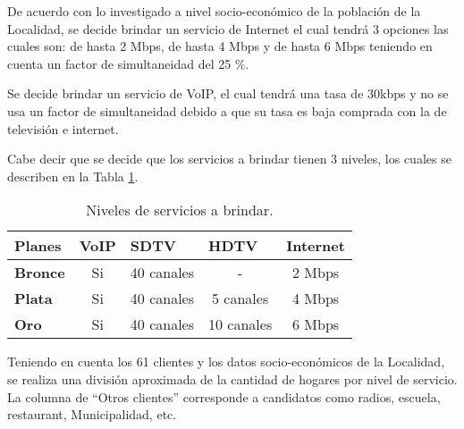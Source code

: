 De acuerdo con lo investigado a nivel socio-económico de la población de la Localidad, se decide brindar un servicio de Internet el cual tendrá 3 opciones las cuales son: de hasta 2 Mbps, de hasta 4 Mbps y de hasta 6 Mbps teniendo en cuenta un factor de simultaneidad del 25 \%.  

Se decide brindar un servicio de VoIP, el cual tendrá una tasa de 30kbps y no se usa un factor de simultaneidad  debido a que su tasa es baja comprada con la de televisión e internet.

Cabe decir que se decide que los servicios a brindar tienen 3 niveles, los cuales se describen en la Tabla \ref{tab:niv-serv}.
\begin{table}[H]
  \centering
    \begin{tabular}{|l|c|c|c|c|}
    \hline
    \rowcolor[HTML]{C5D9F1} \textbf{Planes} & \multicolumn{1}{l|}{\textbf{VoIP}} & \multicolumn{1}{l|}{\textbf{SDTV}} & \multicolumn{1}{l|}{\textbf{HDTV}} & \multicolumn{1}{l|}{\textbf{Internet}} \bigstrut\\
    \hline
    \rowcolor[HTML]{C5D9F1} \textbf{Bronce} & \cellcolor[rgb]{ 1,  1,  1}Si & \cellcolor[rgb]{ 1,  1,  1}40 canales & \cellcolor[rgb]{ 1,  1,  1}- & \cellcolor[rgb]{ 1,  1,  1}2 Mbps \bigstrut\\
    \hline
    \rowcolor[HTML]{C5D9F1} \textbf{Plata} & \cellcolor[rgb]{ 1,  1,  1}Si & \cellcolor[rgb]{ 1,  1,  1}40 canales & \cellcolor[rgb]{ 1,  1,  1}5 canales & \cellcolor[rgb]{ 1,  1,  1}4 Mbps \bigstrut\\
    \hline
    \rowcolor[HTML]{C5D9F1} \textbf{Oro} & \cellcolor[rgb]{ 1,  1,  1}Si & \cellcolor[rgb]{ 1,  1,  1}40 canales & \cellcolor[rgb]{ 1,  1,  1}10 canales & \cellcolor[rgb]{ 1,  1,  1}6 Mbps \bigstrut\\
    \hline
    \end{tabular}%
  \caption{Niveles de servicios a brindar.}
  \label{tab:niv-serv}%

\end{table}%



Teniendo en cuenta los 61 clientes y los datos socio-económicos de la Localidad, se realiza una división aproximada de la cantidad de hogares por nivel de servicio. La columna de “Otros clientes” corresponde a candidatos como radios, escuela, restaurant, Municipalidad, etc.

